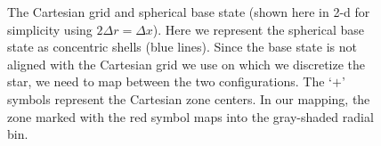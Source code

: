 \clearpage

\begin{figure}[tpb]
\begin{center}
\caption{\label{fig:mapping} The Cartesian grid and spherical base
state (shown here in 2-d for simplicity using $2 \Delta r = \Delta x$).
Here we represent the
spherical base state as concentric shells (blue lines).  Since the
base state is not aligned with the Cartesian grid we use on which
we discretize the star, we need to map between the two configurations.
The `$+$' symbols represent the Cartesian zone centers.  In our
mapping, the zone marked with the red symbol maps into the gray-shaded
radial bin. }
\label{fig:mapping}
\end{center}
\end{figure}
